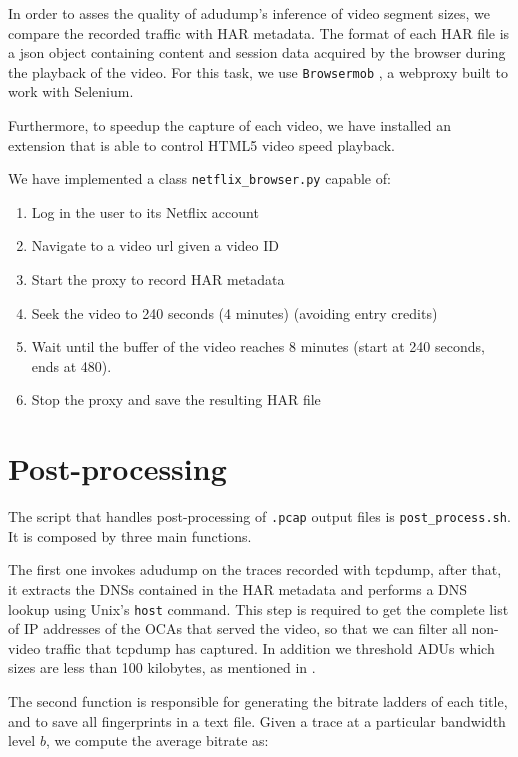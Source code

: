 In order to asses the quality of adudump's inference of video segment sizes, we
compare the recorded traffic with HAR \cite{har} metadata. The format of each
HAR file is a json object containing content and session data acquired by the
browser during the playback of the video. For this task, we use
\texttt{Browsermob} \cite{browsermob}, a webproxy built to work with Selenium.

Furthermore, to speedup the capture of each video, we have installed an
extension that is able to control HTML5 video speed playback.

\newpage
We have implemented a class \texttt{netflix\_browser.py} capable of:

\begin{enumerate}
    \item Log in the user to its Netflix account
    \item Navigate to a video url given a video ID
    \item Start the proxy to record HAR metadata
    \item Seek the video to 240 seconds (4 minutes) (avoiding entry credits)
    \item Wait until the buffer of the video reaches 8 minutes (start at 240
        seconds, ends at 480).
    \item Stop the proxy and save the resulting HAR file
\end{enumerate}


\section{Post-processing}

The script that handles post-processing of \texttt{.pcap} output files is
\texttt{post\_process.sh}. It is composed by three main functions.

The first one invokes adudump on the traces recorded with tcpdump, after that,
it extracts the DNSs contained in the HAR metadata and performs a DNS lookup
using Unix's \texttt{host} command. This step is required to get the complete
list of IP addresses of the OCAs that served the video, so that we can filter
all non-video traffic that tcpdump has captured. In addition we threshold ADUs
which sizes are less than 100 kilobytes, as mentioned in .

The second function is responsible for generating the bitrate ladders of each
title, and to save all fingerprints in a text file. Given a trace at a
particular bandwidth level $b$, we compute the average bitrate as:

